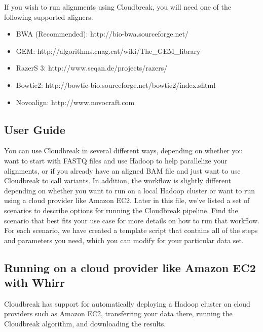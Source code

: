 \documentclass[11pt]{article}
\begin{document}
If you wish to run alignments using Cloudbreak, you will need one of the following
supported aligners:

\begin{itemize}
\item BWA (Recommended): http:/\slash bio-bwa.sourceforge.net\slash 

\item GEM: http:/\slash algorithms.cnag.cat\slash wiki\slash The\_GEM\_library

\item RazerS 3: http:/\slash www.seqan.de\slash projects\slash razers\slash 

\item Bowtie2: http:/\slash bowtie-bio.sourceforge.net\slash bowtie2\slash index.shtml

\item Novoalign: http:/\slash www.novocraft.com

\end{itemize}

\subsection{User Guide}
\label{userguide}

You can use Cloudbreak in several different ways, depending on whether you want
to start with FASTQ files and use Hadoop to help parallelize your alignments, or if you already
have an aligned BAM file and just want to use Cloudbreak to call variants. In addition,
the workflow is slightly different depending on whether you want to run on a local
Hadoop cluster or want to run using a cloud provider like Amazon EC2. Later in this
file, we've listed a set of scenarios to describe options for running the Cloudbreak
pipeline. Find the scenario that best fits your use case for more details on how to
run that workflow. For each scenario, we have created a template script that contains
all of the steps and parameters you need, which you can modify for your particular data set.

\subsection{Running on a cloud provider like Amazon EC2 with Whirr}
\label{runningonacloudproviderlikeamazonec2withwhirr}

Cloudbreak has support for automatically deploying a Hadoop cluster on
cloud providers such as Amazon EC2, transferring your data there, running the Cloudbreak algorithm, and
downloading the results.
\end{document}
